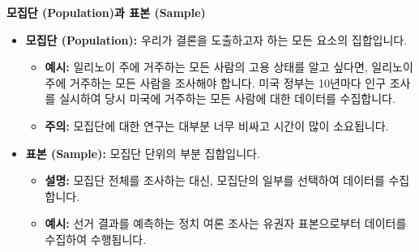 \documentclass[11pt,a4paper]{article}
\theoremstyle{definition}
\begin{document}
\begin{tcolorbox}[title={데이터 세트의 구성 요소 (What Is In The Data Set?)}]
\textbf{모집단 (Population)과 표본 (Sample)}

\begin{center}
\label{fig:population_sample}
\end{center}

\begin{itemize}
    \item \textbf{모집단 (Population):} 우리가 결론을 도출하고자 하는 모든 요소의 집합입니다.
    \begin{itemize}
        \item \textbf{예시:} 일리노이 주에 거주하는 모든 사람의 고용 상태를 알고 싶다면, 일리노이 주에 거주하는 모든 사람을 조사해야 합니다. 미국 정부는 10년마다 인구 조사를 실시하여 당시 미국에 거주하는 모든 사람에 대한 데이터를 수집합니다.
        \item \textbf{주의:} 모집단에 대한 연구는 대부분 너무 비싸고 시간이 많이 소요됩니다.
    \end{itemize}
    \item \textbf{표본 (Sample):} 모집단 단위의 부분 집합입니다.
    \begin{itemize}
        \item \textbf{설명:} 모집단 전체를 조사하는 대신, 모집단의 일부를 선택하여 데이터를 수집합니다.
        \item \textbf{예시:} 선거 결과를 예측하는 정치 여론 조사는 유권자 표본으로부터 데이터를 수집하여 수행됩니다.
    \end{itemize}
\end{itemize}
\end{tcolorbox}
\end{document}
